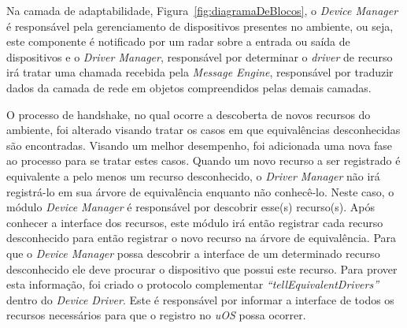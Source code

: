 Na camada de adaptabilidade, Figura~\ref{fig:diagramaDeBlocos}, o \emph{Device Manager} é responsável pela gerenciamento de dispositivos presentes no ambiente, ou seja, este componente é notificado por um radar sobre a entrada ou saída de dispositivos e o \emph{Driver Manager}, responsável por determinar o \emph{driver} de recurso irá tratar uma chamada recebida pela \emph{Message Engine}, responsável por traduzir dados da camada de rede em objetos compreendidos pelas demais camadas.

O processo de handshake, no qual ocorre a descoberta de novos recursos do ambiente, foi alterado visando tratar os casos em que equivalências desconhecidas são encontradas. Visando um melhor desempenho, foi adicionada uma nova fase ao processo para se tratar estes casos. Quando um novo recurso a ser registrado é equivalente a pelo menos um recurso desconhecido, o \emph{Driver Manager} não irá registrá-lo em sua árvore de equivalência enquanto não conhecê-lo. Neste caso, o módulo \emph{Device Manager} é responsável por descobrir esse(s) recurso(s). Após conhecer a interface dos recursos, este módulo irá então registrar cada recurso desconhecido para então registrar o novo recurso na árvore de equivalência. Para que o \emph{Device Manager} possa descobrir a interface de um determinado recurso desconhecido ele deve procurar o dispositivo que possui este recurso. Para prover esta informação, foi criado o protocolo complementar \emph{``tellEquivalentDrivers''} dentro do \emph{Device Driver}. Este é responsável por informar a interface de todos os recursos necessários para que o registro no \emph{uOS} possa ocorrer.